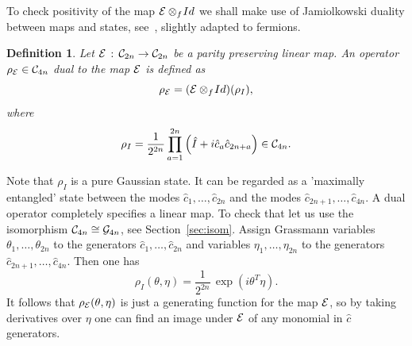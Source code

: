 \documentclass[twocolumn,showpacs,preprintnumbers,superscriptaddress]{revtex4}
\newtheorem{dfn}{Definition}
\newcommand{\calE}{{\cal E }}
\newcommand{\Clif}{{\cal C}}
\newcommand{\Gr}{{\cal G}}
\newcommand{\cop}{{\hat{c}}}
\newcommand{\Iop}{{\hat{I}}}
\begin{document}
To check positivity of the map $\calE\otimes_f\! Id$ we shall make use
of  Jamiolkowski duality between maps and states, see~\cite{Jamiol72,VV02},
slightly adapted to fermions.
\begin{dfn}\label{def:dual}
Let $\calE\, : \, \Clif_{2n} \to \Clif_{2n}$ be a parity preserving
linear map. An operator $\rho_{\calE}\in \Clif_{4n}$ dual to the map $\calE$
is defined as
\[
\rho_{\calE}=(\calE\otimes_f\! Id)(\rho_I),
\]
where
\[
\rho_I=\frac1{2^{2n}}
\prod_{a=1}^{2n} \left(\Iop + i\cop_a \cop_{2n+a}\right)\in \Clif_{4n}.
\]
\end{dfn}
Note that $\rho_I$ is a pure Gaussian state. It can be regarded as 
a 'maximally entangled' state between the modes $\cop_1,\ldots,\cop_{2n}$
and the modes $\cop_{2n+1},\ldots,\cop_{4n}$.
A dual operator completely specifies a linear map. To check that let us
use the isomorphism $\Clif_{4n}\cong \Gr_{4n}$, see
Section~\ref{sec:isom}. Assign Grassmann variables $\theta_1,\ldots,\theta_{2n}$
to the generators
$\cop_1,\ldots,\cop_{2n}$ and variables $\eta_1,\ldots,\eta_{2n}$ to the generators
$\cop_{2n+1},\ldots,\cop_{4n}$. Then one has
\[
\rho_I(\theta,\eta)=\frac1{2^{2n}}\, \exp{\left( i\theta^T\eta\right)}.
\]
It follows that $\rho_{\calE}(\theta,\eta)$ is just a generating function for
the map $\calE$, so by taking derivatives over $\eta$ one can find an image
under $\calE$ of any monomial in $\cop$ generators.
\end{document}
